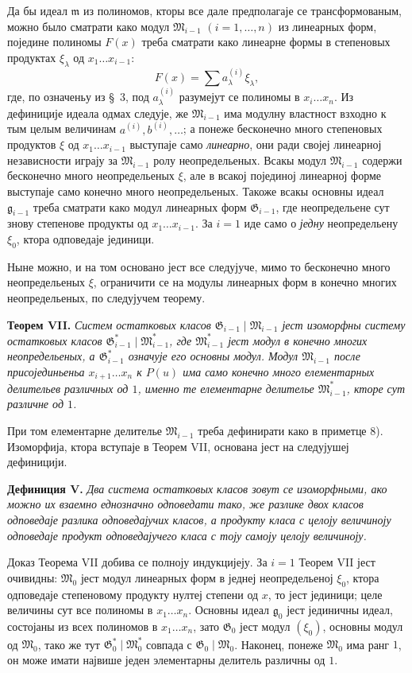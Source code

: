 \documentclass[11pt]{article}
\providecommand{\Gmod}{\mathfrak G}
\providecommand{\Mmod}{\mathfrak M}
\providecommand{\mideal}{\mathfrak m}
\providecommand{\gideal}{\mathfrak g}
\begin{document}
Да бы идеал $\mideal$ из полиномов, кторы все дале предполагаје се трансформованым, можно было сматрати како модул $\Mmod_{i-1}$ $(i=1,\ldots,n)$ из линеарных форм, поједине полиномы $F(x)$ треба сматрати како линеарне формы в степеновых продуктах $\xi_\lambda$ од $x_1\ldots x_{i-1}$:
\[
  F(x)=\sum a^{(i)}_\lambda\xi_\lambda,
\]
где, по означеньу из §~3, под $a^{(i)}_\lambda$ разумејут се полиномы в $x_i\ldots x_n$. Из дефиниције идеала одмах следује, же $\Mmod_{i-1}$ има модулну властност взходно к тым целым величинам $a^{(i)},b^{(i)},\ldots$; а понеже бесконечно много степеновых продуктов $\xi$ од $x_1\ldots x_{i-1}$ выступаје само {\itshape линеарно}, они ради својеј линеарној независности играју за $\Mmod_{i-1}$ ролу неопредельеных. Всакы модул $\Mmod_{i-1}$ содержи бесконечно много неопредельеных $\xi$, але в всакој појединој линеарној форме выступаје само конечно много неопредельеных. Такоже всакы основны идеал $\gideal_{i-1}$ треба сматрати како модул линеарных форм $\Gmod_{i-1}$, где неопредельене сут знову степенове продукты од $x_1\ldots x_{i-1}$. За $i=1$ иде само о {\itshape једну} неопредельену $\xi_0$, ктора одповедаје јединици.

Ныне можно, и на том основано јест все следујуче, мимо то бесконечно много неопредельеных $\xi$, ограничити се на модулы линеарных форм в конечно многих неопредельеных, по следујучем теорему.

\medskip
\noindent\textbf{Теорем VII.} {\itshape Систем остатковых класов $\Gmod_{i-1}\mid \Mmod_{i-1}$ јест изоморфны систему остатковых класов $\Gmod^*_{i-1}\mid \Mmod^*_{i-1}$, где $\Mmod^*_{i-1}$ јест модул в конечно многих неопредельеных, а $\Gmod^*_{i-1}$ означује его основны модул. Модул $\Mmod_{i-1}$ после присојединьеньа $x_{i+1}\ldots x_n$ к $P(u)$ има само конечно много елементарных делительев различных од $1$, именно те елементарне делителье $\Mmod^*_{i-1}$, кторе сут различне од $1$.}

При том елементарне делителье $\Mmod_{i-1}$ треба дефинирати како в приметце 8). Изоморфија, ктора вступаје в Теорем VII, основана јест на следујушеј дефиницији.

\medskip
\noindent\textbf{Дефиниция V.} {\itshape Два система остатковых класов зовут се изоморфными, ако можно их взаемно еднозначно одповедати тако, же разлике двох класов одповедаје разлика одповедајучих класов, а продукту класа с целоју величиноју одповедаје продукт одповедајучего класа с тоју самоју целоју величиноју.}

Доказ Теорема VII добива се полноју индукцијеју. За $i=1$ Теорем VII јест очивидны: $\Mmod_0$ јест модул линеарных форм в једнеј неопредельеној $\xi_0$, ктора одповедаје степеновому продукту нултеј степени од $x$, то јест јединици; целе величины сут все полиномы в $x_1\ldots x_n$. Основны идеал $\gideal_0$ јест јединичны идеал, состојаны из всех полиномов в $x_1\ldots x_n$, зато $\Gmod_0$ јест модул $(\xi_0)$, основны модул од $\Mmod_0$, тако же тут $\Gmod^*_0\mid\Mmod^*_0$ совпада с $\Gmod_0\mid\Mmod_0$. Наконец, понеже $\Mmod_0$ има ранг $1$, он може имати највише једен элементарны делитель различны од $1$.
\end{document}
